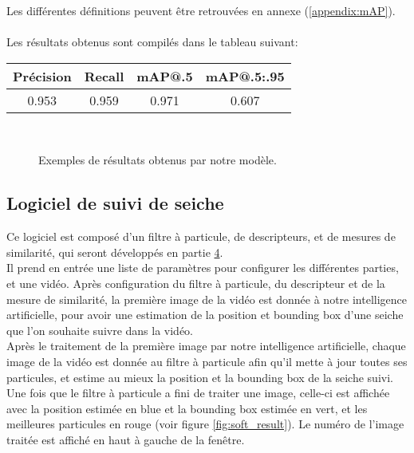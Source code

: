 Les différentes définitions peuvent être retrouvées en annexe (\ref{appendix:mAP}).\\
\\
Les résultats obtenus sont compilés dans le tableau suivant:\\
\begin{center}
\begin{tabular}{|c|c|c|c|}
	\hline
	Précision & Recall & mAP@.5 & mAP@.5:.95\\
	\hline
	0.953 & 0.959 & 0.971 & 0.607\\
	\hline
\end{tabular}
\end{center}

\begin{figure}[!htbp]
\center
	\hspace{0.1cm}
	\\
	\hspace{0.1cm}
\caption{Exemples de résultats obtenus par notre modèle.}
\label{fig:ai_examples}
\end{figure}
\FloatBarrier



\subsection{Logiciel de suivi de seiche}
Ce logiciel est composé d'un filtre à particule, de descripteurs, et de mesures de similarité, qui seront développés en partie \hyperlink{chapter.4}{4}.\\
Il prend en entrée une liste de paramètres pour configurer les différentes parties, et une vidéo. Après configuration du filtre à particule, du descripteur et de la mesure de similarité, la première image de la vidéo est donnée à notre intelligence artificielle, pour avoir une estimation de la position et bounding box d'une seiche que l'on souhaite suivre dans la vidéo.\\
Après le traitement de la première image par notre intelligence artificielle, chaque image de la vidéo est donnée au filtre à particule afin qu'il mette à jour toutes ses particules, et estime au mieux la position et la bounding box de la seiche suivi.\\
Une fois que le filtre à particule a fini de traiter une image, celle-ci est affichée avec la position estimée en blue et la bounding box estimée en vert, et les meilleures particules en rouge (voir figure \ref{fig:soft_result}). Le numéro de l'image traitée est affiché en haut à gauche de la fenêtre.\\

